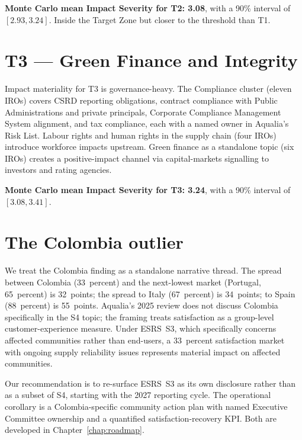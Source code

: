 \documentclass[11pt, a4paper, twoside, openright]{scrreprt}
\begin{document}
\begin{insight}
\textbf{Monte Carlo mean Impact Severity for T2: 3.08}, with a 90\% interval of $[2.93, 3.24]$. Inside the Target Zone but closer to the threshold than T1.
\end{insight}

\section{T3 --- Green Finance and Integrity}

Impact materiality for T3 is governance-heavy. The Compliance cluster (eleven IROs) covers CSRD reporting obligations, contract compliance with Public Administrations and private principals, Corporate Compliance Management System alignment, and tax compliance, each with a named owner in Aqualia's Risk List. Labour rights and human rights in the supply chain (four IROs) introduce workforce impacts upstream. Green finance as a standalone topic (six IROs) creates a positive-impact channel via capital-markets signalling to investors and rating agencies.

\begin{insight}
\textbf{Monte Carlo mean Impact Severity for T3: 3.24}, with a 90\% interval of $[3.08, 3.41]$.
\end{insight}

\section{The Colombia outlier}

We treat the Colombia finding as a standalone narrative thread. The spread between Colombia (33~percent) and the next-lowest market (Portugal, 65~percent) is 32~points; the spread to Italy (67~percent) is 34~points; to Spain (88~percent) is 55~points. Aqualia's 2025 review does not discuss Colombia specifically in the S4 topic; the framing treats satisfaction as a group-level customer-experience measure. Under ESRS~S3, which specifically concerns affected communities rather than end-users, a 33~percent satisfaction market with ongoing supply reliability issues represents material impact on affected communities.

Our recommendation is to re-surface ESRS~S3 as its own disclosure rather than as a subset of S4, starting with the 2027 reporting cycle. The operational corollary is a Colombia-specific community action plan with named Executive Committee ownership and a quantified satisfaction-recovery KPI. Both are developed in Chapter~\ref{chap:roadmap}.
\end{document}
